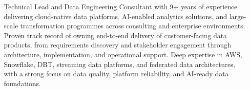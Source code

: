 
\begin{cvparagraph}

Technical Lead and Data Engineering Consultant with 9+ years of experience delivering cloud-native data platforms, AI-enabled analytics solutions, and large-scale transformation programmes across consulting and enterprise environments. Proven track record of owning end-to-end delivery of customer-facing data products, from requirements discovery and stakeholder engagement through architecture, implementation, and operational support. Deep expertise in AWS, Snowflake, DBT, streaming data platforms, and federated data architectures, with a strong focus on data quality, platform reliability, and AI-ready data foundations.
\end{cvparagraph}
